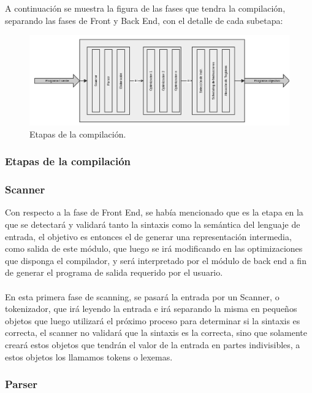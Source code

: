 \documentclass[fleqn]{tcdl}
\begin{document}
A continuación se muestra la figura de las fases que tendra la compilación, separando las fases de Front y Back End, con el detalle de cada subetapa:

\begin{figure}[h]
\captionsetup{type=figure}
\includegraphics[width=\textwidth]{mucho_mas_detallado.png}
\caption{\label{fig:inter}Etapas de la compilación.}
\end{figure}
\bigskip

\subsubsection*{Etapas de la compilación}

\subsubsection*{Scanner}

Con respecto a la fase de Front End, se había mencionado que es la etapa en la que se detectará y validará tanto la sintaxis como la semántica del lenguaje de entrada, el objetivo es entonces el de generar una representación intermedia, como salida de este módulo, que luego se irá modificando en las optimizaciones que disponga el compilador, y será interpretado por el módulo de back end a fin de generar el programa de salida requerido por el usuario.
\\\\
En esta primera fase de scanning, se pasará la entrada por un Scanner, o tokenizador, que irá leyendo la entrada e irá separando la misma en pequeños objetos que luego utilizará el próximo proceso para determinar si la sintaxis es correcta, el scanner no validará que la sintaxis es la correcta, sino que solamente creará estos objetos que tendrán el valor de la entrada en partes indivisibles, a estos objetos los llamamos tokens o lexemas.


\subsubsection*{Parser}
\end{document}
